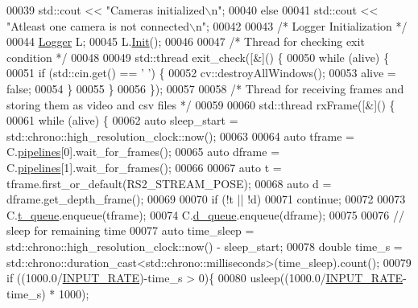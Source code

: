 \begin{DoxyCode}
00039         std::cout << \textcolor{stringliteral}{"Cameras initialized\(\backslash\)n"};
00040     \textcolor{keywordflow}{else} 
00041         std::cout << \textcolor{stringliteral}{"Atleast one camera is not connected\(\backslash\)n"};
00042 
00043     \textcolor{comment}{/* Logger Initialization */}
00044     \hyperlink{classLogger}{Logger} L;
00045     L.\hyperlink{classLogger_a42c282f4c0e2c6557d16e2967c1ddf7e}{Init}();
00046 
00047     \textcolor{comment}{/* Thread for checking exit condition */}
00048 
00049     std::thread exit\_check([&]() \{
00050         \textcolor{keywordflow}{while} (alive) \{
00051             \textcolor{keywordflow}{if} (std::cin.\textcolor{keyword}{get}() == \textcolor{charliteral}{' '}) \{
00052                 cv::destroyAllWindows();
00053                 alive = \textcolor{keyword}{false};
00054             \}
00055         \}
00056     \});
00057 
00058     \textcolor{comment}{/* Thread for receiving frames and storing them as video and csv files */} 
00059 
00060     std::thread rxFrame([&]() \{
00061         \textcolor{keywordflow}{while} (alive) \{
00062             \textcolor{keyword}{auto} sleep\_start = std::chrono::high\_resolution\_clock::now();
00063 
00064             \textcolor{keyword}{auto} tframe = C.\hyperlink{classCamera_a689d4141375d8f7fbf1651338c1ea9c0}{pipelines}[0].wait\_for\_frames();
00065             \textcolor{keyword}{auto} dframe = C.\hyperlink{classCamera_a689d4141375d8f7fbf1651338c1ea9c0}{pipelines}[1].wait\_for\_frames();
00066 
00067             \textcolor{keyword}{auto} t = tframe.first\_or\_default(RS2\_STREAM\_POSE);
00068             \textcolor{keyword}{auto} d = dframe.get\_depth\_frame();
00069 
00070             \textcolor{keywordflow}{if} (!t || !d)
00071                 \textcolor{keywordflow}{continue};
00072 
00073             C.\hyperlink{classCamera_ad8a4c52c0ae125ab8ca66902408f5e95}{t\_queue}.enqueue(tframe);
00074             C.\hyperlink{classCamera_a84a3a043e61b967fb1dc6fbe62bf33aa}{d\_queue}.enqueue(dframe);
00075 
00076             \textcolor{comment}{// sleep for remaining time}
00077             \textcolor{keyword}{auto} time\_sleep = std::chrono::high\_resolution\_clock::now() - sleep\_start;
00078             \textcolor{keywordtype}{double} time\_s = std::chrono::duration\_cast<std::chrono::milliseconds>(time\_sleep).count();
00079             \textcolor{keywordflow}{if} ((1000.0/\hyperlink{Camera_8hpp_a4a8be390afbe56038ccc6fe44e61aa00}{INPUT\_RATE})-time\_s > 0)\{
00080                 usleep((1000.0/\hyperlink{Camera_8hpp_a4a8be390afbe56038ccc6fe44e61aa00}{INPUT\_RATE}-time\_s) * 1000);

\end{DoxyCode}
